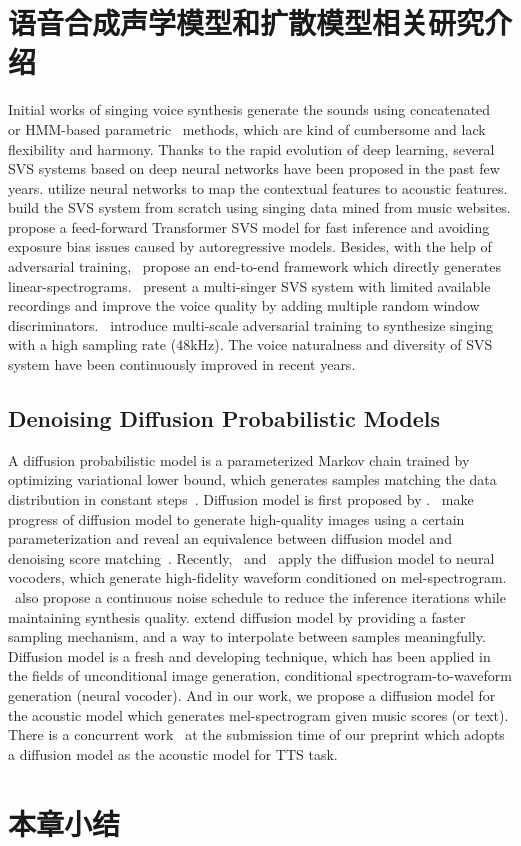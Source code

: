 \section{语音合成声学模型和扩散模型相关研究介绍}
\label{sec:svs_intro}
Initial works of singing voice synthesis generate the sounds using concatenated~\citep{macon1997concatenation,kenmochi2007vocaloid} or HMM-based parametric~\citep{saino2006hmm,oura2010recent} methods, which are kind of cumbersome and lack flexibility and harmony. Thanks to the rapid evolution of deep learning, several SVS systems based on deep neural networks have been proposed in the past few years. \citet{nishimura2016singing,blaauw2017neural,kim2018korean,nakamura2019singing,gu2020bytesing} utilize neural networks to map the contextual features to acoustic features. \citet{ren2020deepsinger} build the SVS system from scratch using singing data mined from music websites. \citet{blaauw2020sequence} propose a feed-forward Transformer SVS model for fast inference and avoiding exposure bias issues caused by autoregressive models. Besides,
with the help of adversarial training, \citet{lee2019adversarially}~propose an end-to-end framework which directly generates linear-spectrograms. \citet{wu2020adversarially}~present a multi-singer SVS system with limited available recordings and improve the voice quality by adding multiple random window discriminators. \citet{chen2020hifisinger}~introduce multi-scale adversarial training to synthesize singing with a high sampling rate (48kHz). The voice naturalness and diversity of SVS system
have been continuously improved in recent years.

\subsection{Denoising Diffusion Probabilistic Models}
A diffusion probabilistic model is a parameterized Markov chain trained by optimizing variational lower bound, which generates samples matching the data distribution in constant steps~\citep{Ho2020ddpm}. Diffusion model is first proposed by \citet{sohl2015deep}. \citet{Ho2020ddpm}~make progress of diffusion model to generate high-quality images using a certain parameterization and reveal an equivalence between diffusion model and denoising score matching~\citep{song2019generative,song2021scorebased}. Recently, \citet{kong2021diffwave}~and
\citet{chen2021wavegrad}~apply the diffusion model to neural vocoders, which generate high-fidelity waveform conditioned on mel-spectrogram. \citet{chen2021wavegrad}~also propose a continuous noise schedule to reduce the inference iterations while maintaining synthesis quality. \citet{song2021denoising} extend diffusion model by providing a faster sampling mechanism, and a way to interpolate between samples meaningfully. Diffusion model is a fresh and developing technique, which has been applied in the fields of unconditional image generation, conditional spectrogram-to-waveform generation (neural vocoder). And in our work, we propose a diffusion model for the acoustic model which generates mel-spectrogram given music scores (or text). There is a concurrent work~\citep{jeong2021diff} at the submission time of our preprint which adopts a diffusion model as the acoustic model for TTS task.
\section{本章小结}
